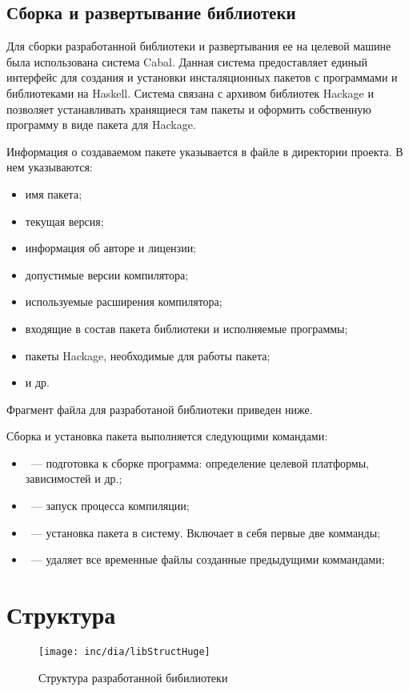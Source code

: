 \subsection{Сборка и развертывание библиотеки}

Для сборки разработанной библиотеки и развертывания ее на целевой машине была использована система Cabal. Данная система предоставляет единый интерфейс для создания и установки инсталяционных пакетов с программами и библиотеками на Haskell. Система связана с архивом библиотек Hackage и позволяет устанавливать хранящиеся там пакеты и оформить собственную программу в виде пакета для Hackage.

Информация о создаваемом пакете указывается в файле  в директории проекта. В нем указываются:
    
\begin{itemize}
\item имя пакета;

\item текущая версия;

\item информация об авторе и лицензии;

\item допустимые версии компилятора;

\item используемые расширения компилятора;

\item входящие в состав пакета библиотеки и исполняемые программы;

\item пакеты Hackage, необходимые для работы пакета;

\item и др.

\end{itemize}
    
    
Фрагмент файла  для разработаной библиотеки приведен ниже.



Сборка и установка пакета выполняется следующими командами:

\begin{itemize}
\item {}~--- подготовка к сборке программа: определение целевой платформы, зависимостей и др.;

\item {}~--- запуск процесса компиляции;

\item {}~--- установка пакета в систему. Включает в себя первые две комманды;

\item {}~--- удаляет все временные файлы созданные предыдущими коммандами;

\end{itemize}
    
    
\section{Структура}

\begin{figure}[ht]
  \centering
  \texttt{[image: inc/dia/libStructHuge]}
  \caption{Структура разработанной бибилиотеки}
  \label{fig:libStruct}
\end{figure}


